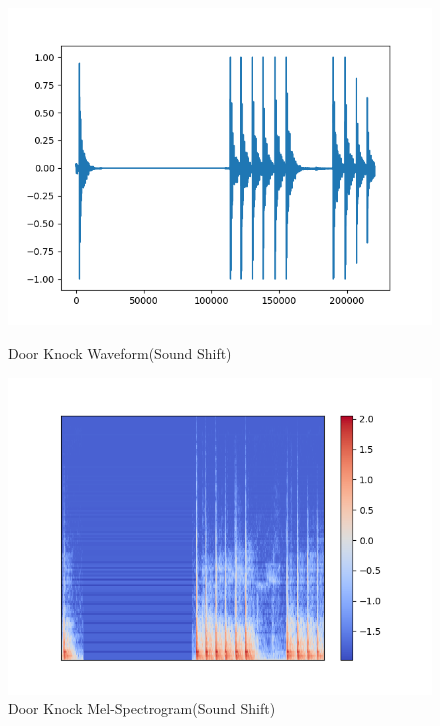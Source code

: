 \begin{figure}[H]
\begin{minipage}[t]{0.5\textwidth}
\centering
\includegraphics[width=\textwidth]{./graph/door_wood_knock_SoundShift_wave.png} 
\caption{Door Knock Waveform(Sound Shift)}
\label{SSTwave}
\end{minipage}
\begin{minipage}[t]{0.5\textwidth}
\centering
\includegraphics[width=\textwidth]{./graph/door_wood_knock_SoundShift_melsp.png} 
\caption{Door Knock Mel-Spectrogram(Sound Shift)}
\label{SSTsp}
\end{minipage}
\end{figure}

